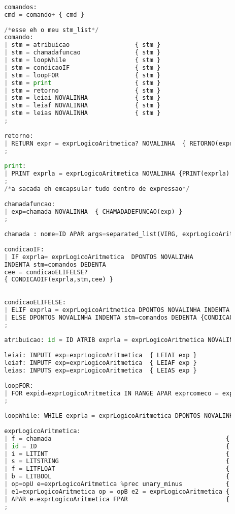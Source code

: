 \documentclass[hidelinks,12pt]{article}
\begin{document}
\begin{appendices}
\begin{lstlisting}[caption=sintatico.mly, language=python]
		
		comandos:
		cmd = comando+ { cmd }
		
		/*esse eh o meu stm_list*/
		comando:
		| stm = atribuicao 					{ stm }
		| stm = chamadafuncao   			{ stm }
		| stm = loopWhile					{ stm }
		| stm = condicaoIF      			{ stm } 
		| stm = loopFOR 					{ stm }	
		| stm = print 						{ stm }
		| stm = retorno 					{ stm } 
		| stm = leiai NOVALINHA 			{ stm }
		| stm = leiaf NOVALINHA  			{ stm }
		| stm = leias NOVALINHA  			{ stm }
		;
		
		retorno:
		| RETURN expr = exprLogicoAritmetica? NOVALINHA  { RETORNO(expr) }
		;
		
		print:
		| PRINT exprla = exprLogicoAritmetica NOVALINHA {PRINT(exprla) }
		;
		/*a sacada eh emcapsular tudo dentro de expressao*/
		
		chamadafuncao:
		| exp=chamada NOVALINHA  { CHAMADADEFUNCAO(exp) }
		;
		
		chamada : nome=ID APAR args=separated_list(VIRG, exprLogicoAritmetica) FPAR { EXPCALL (nome, args) }
		
		condicaoIF:
		| IF exprla= exprLogicoAritmetica  DPONTOS NOVALINHA 
		INDENTA stm=comandos DEDENTA
		cee = condicaoELIFELSE?
		{ CONDICAOIF(exprla,stm,cee) }
		
		
		condicaoELIFELSE:
		| ELIF exprla = exprLogicoAritmetica DPONTOS NOVALINHA INDENTA stm = comandos DEDENTA condEE = condicaoELIFELSE? { CONDICAOIF (exprla,stm, condEE) }
		| ELSE DPONTOS NOVALINHA INDENTA stm=comandos DEDENTA {CONDICAOElifElse( stm ) }
		;
		
		atribuicao: id = ID ATRIB exprla = exprLogicoAritmetica NOVALINHA   { ATRIBUICAO (EXPVAR id , exprla) } 
		
		leiai: INPUTI exp=exprLogicoAritmetica  { LEIAI exp }
		leiaf: INPUTF exp=exprLogicoAritmetica  { LEIAF exp }
		leias: INPUTS exp=exprLogicoAritmetica  { LEIAS exp }
		
		loopFOR:
		| FOR expid=exprLogicoAritmetica IN RANGE APAR exprcomeco = exprLogicoAritmetica VIRG exprfim = exprLogicoAritmetica FPAR DPONTOS NOVALINHA INDENTA stm = comandos DEDENTA 	{ FORLOOP(expid,exprcomeco,exprfim,stm)}
		;
		
		loopWhile: WHILE exprla = exprLogicoAritmetica DPONTOS NOVALINHA INDENTA stm = comandos DEDENTA	{ WHILELOOP(exprla,stm) }	
		
		exprLogicoAritmetica:
		| f = chamada 												 { f 				 }
		| id = ID 													 { EXPVAR(id)    	 }
		| i = LITINT 												 { EXPINT(i)   		 }
		| s = LITSTRING 											 { EXPSTRING(s)		 }
		| f = LITFLOAT 												 { EXPFLOAT(f) 	  	 }
		| b = LITBOOL												 { EXPBOOL (b)	 }	
		| op=opU e=exprLogicoAritmetica %prec unary_minus 			 { EXPOPU (op,e) 	 }
		| e1=exprLogicoAritmetica op = opB e2 = exprLogicoAritmetica { EXPOPB (op,e1,e2) }
		| APAR e=exprLogicoAritmetica FPAR 							 { e 		    	 }
		;
		

\end{lstlisting}
\end{appendices}
\end{document}
